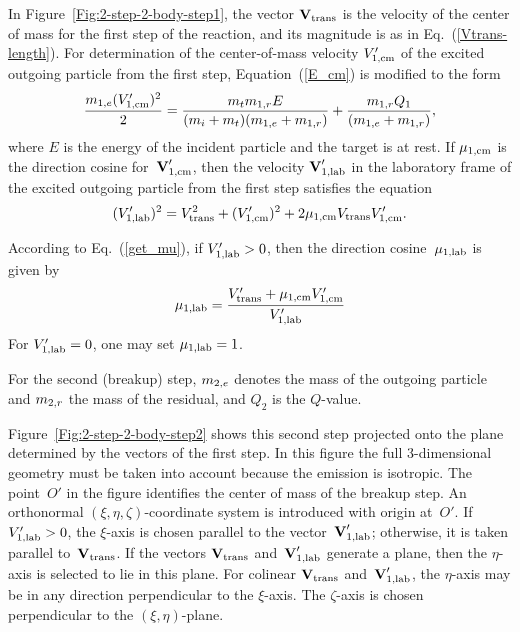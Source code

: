 {In Figure~\ref{Fig:2-step-2-body-step1}, the vector $\textbf{V}_{\text{trans}}$ 
is the velocity of the center of
mass for the first step of the reaction, and its magnitude is
as in Eq.~(\ref{Vtrans-length}).  For determination of the 
center-of-mass velocity $V_{\text{1,cm}}'$
of the excited outgoing particle from the first step,
Equation~(\ref{E_cm}) is modified to the form
$$
  \frac{m_{1,e} ({V_{\text{1,cm}}'})^2}{2} =
    \frac{ m_t m_{1,r} E} { ( m_i + m_t ) ( m_{1,e} + m_{1,r} ) } +
    \frac{ m_{1,r} Q_1} { ( m_{1,e} + m_{1,r} ) },
$$
where $E$ is the energy of the incident particle and the
target is at rest.
If $\mu_{\text{1,cm}}$ is the direction cosine for~$\textbf{V}_{\text{1,cm}}'$, 
then the velocity $\textbf{V}_{\text{1,lab}}'$ in the laboratory frame of the
excited outgoing particle from the first step satisfies the equation
$$
  ({V_{\text{1,lab}}'})^2 = V_{\text{trans}}^2 + ({V_{\text{1,cm}}'})^2 +
    2 \mu_{\text{1,cm}} V_{\text{trans}} V_{\text{1,cm}}'.
$$

According to Eq.~(\ref{get_mu}), if $V_{\text{1,lab}}' > 0$, then
the direction cosine~$\mu_{\text{1,lab}}$ is given by
\begin{equation*}
  \mu_{\text{1,lab}}  = \frac
   { V_{\text{trans}}'  + \mu_{\text{1,cm}}  V_{\text{1,cm}}' }
    {V_{\text{1,lab}}'}
\end{equation*}
For $V_{\text{1,lab}}' = 0$, one may set $\mu_{\text{1,lab}} = 1$.

For the second (breakup) step, 
$m_{2,e}$ denotes the mass of the outgoing particle and
$m_{2,r}$ the mass of the residual, and $Q_2$ is
the $Q$-value.  

Figure~\ref{Fig:2-step-2-body-step2} shows this second step
projected onto the plane determined by the vectors of the first step.
In this figure the full 3-dimensional geometry must be taken into
account because the emission is isotropic.  The point~$O'$ in the figure
identifies the center of mass of the breakup step.  An orthonormal 
$(\xi, \eta, \zeta)$-coordinate system
is introduced with origin at~$O'$. If $V_{\text{1,lab}}' > 0$, the $\xi$-axis 
is chosen parallel to
the vector~$\textbf{V}_{\text{1,lab}}'$; otherwise, it is taken parallel to~$\textbf{V}_{\text{trans}}$.
If  the vectors $\textbf{V}_{\text{trans}}$ and~$\textbf{V}_{\text{1,lab}}'$ generate a plane, then
the $\eta$-axis is selected to lie in this plane.  For colinear
$\textbf{V}_{\text{trans}}$ and~$\textbf{V}_{\text{1,lab}}'$, the $\eta$-axis may be in any direction
perpendicular to the $\xi$-axis.
The $\zeta$-axis is chosen perpendicular to the $(\xi, \eta)$-plane.
  
}
